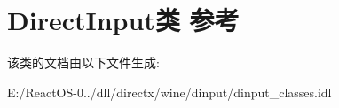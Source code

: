 \hypertarget{class_direct_input}{}\section{Direct\+Input类 参考}
\label{class_direct_input}


该类的文档由以下文件生成\+:\begin{DoxyCompactItemize}
\item 
E\+:/\+React\+O\+S-\/0../dll/directx/wine/dinput/dinput\+\_\+classes.\+idl\end{DoxyCompactItemize}
